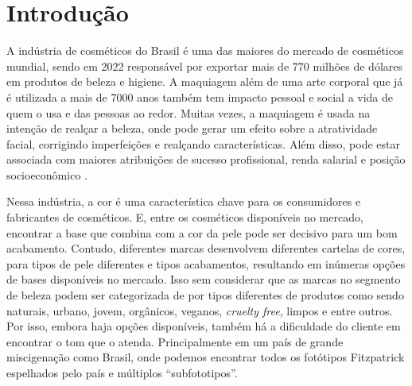 \chapter{Introdução}
\label{cap:introducao}

A indústria de cosméticos do Brasil é uma das maiores do mercado de cosméticos mundial, sendo em 2022 responsável por exportar mais de 770 milhões de dólares em produtos de beleza e higiene\cite{Cosmetics_industry_in_Brazil}. A maquiagem além de uma arte corporal que já é utilizada a mais de 7000 anos também tem impacto pessoal e social a vida de quem o usa e das pessoas ao redor. Muitas vezes, a maquiagem é usada na intenção de realçar a beleza, onde pode gerar um efeito sobre a atratividade facial, corrigindo imperfeições e realçando características. Além disso, pode estar associada com maiores atribuições de sucesso profissional, renda salarial e posição socioeconômico \cite{Respostas_Emocionais_Implícitas_Julgamento_da_Atratividade_Facial_em_Faces}.

 Nessa indústria, a cor é uma característica chave para os consumidores e  fabricantes de cosméticos. E, entre os cosméticos disponíveis no mercado, encontrar a base que combina com a cor da pele pode ser decisivo para um bom acabamento. Contudo, diferentes marcas desenvolvem diferentes cartelas de cores, para tipos de pele diferentes e tipos acabamentos, resultando em inúmeras opções de bases disponíveis no mercado. Isso sem considerar que as marcas no segmento de beleza podem ser categorizada de por tipos diferentes de produtos como sendo naturais, urbano, jovem, orgânicos, veganos, \textit{cruelty free}, limpos e entre outros. Por isso, embora haja opções disponíveis, também há a dificuldade do cliente em encontrar o tom que o atenda. Principalmente em um país de grande miscigenação como Brasil, onde podemos encontrar todos os fotótipos Fitzpatrick espelhados pelo país e múltiplos “subfototipos”.\cite{Régua_de_Pele_Linha_de_Maquiagem_para_a_Mulher_Brasileira}

